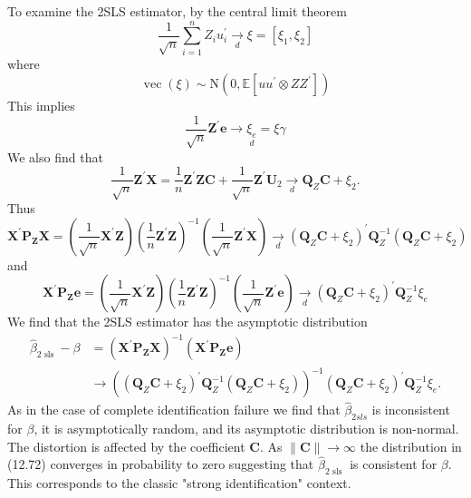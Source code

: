 \documentclass[10pt]{article}
\begin{document}
To examine the 2SLS estimator, by the central limit theorem
$$
\frac{1}{\sqrt{n}} \sum_{i=1}^{n} Z_{i} u_{i}^{\prime} \underset{d}{\longrightarrow} \xi=\left[\xi_{1}, \xi_{2}\right]
$$
where
$$
\operatorname{vec}(\xi) \sim \mathrm{N}\left(0, \mathbb{E}\left[u u^{\prime} \otimes Z Z^{\prime}\right]\right)
$$
This implies
$$
\frac{1}{\sqrt{n}} \boldsymbol{Z}^{\prime} \boldsymbol{e} \longrightarrow \underset{d}{\xi_{e}}=\xi \gamma
$$
We also find that
$$
\frac{1}{\sqrt{n}} \boldsymbol{Z}^{\prime} \boldsymbol{X}=\frac{1}{n} \boldsymbol{Z}^{\prime} \boldsymbol{Z} \boldsymbol{C}+\frac{1}{\sqrt{n}} \boldsymbol{Z}^{\prime} \boldsymbol{U}_{2} \underset{d}{\longrightarrow} \boldsymbol{Q}_{Z} \boldsymbol{C}+\xi_{2} .
$$
Thus
$$
\boldsymbol{X}^{\prime} \boldsymbol{P}_{\boldsymbol{Z}} \boldsymbol{X}=\left(\frac{1}{\sqrt{n}} \boldsymbol{X}^{\prime} \boldsymbol{Z}\right)\left(\frac{1}{n} \boldsymbol{Z}^{\prime} \boldsymbol{Z}\right)^{-1}\left(\frac{1}{\sqrt{n}} \boldsymbol{Z}^{\prime} \boldsymbol{X}\right) \underset{d}{\longrightarrow}\left(\boldsymbol{Q}_{Z} \boldsymbol{C}+\xi_{2}\right)^{\prime} \boldsymbol{Q}_{Z}^{-1}\left(\boldsymbol{Q}_{Z} \boldsymbol{C}+\xi_{2}\right)
$$
and
$$
\boldsymbol{X}^{\prime} \boldsymbol{P}_{\boldsymbol{Z}} \boldsymbol{e}=\left(\frac{1}{\sqrt{n}} \boldsymbol{X}^{\prime} \boldsymbol{Z}\right)\left(\frac{1}{n} \boldsymbol{Z}^{\prime} \boldsymbol{Z}\right)^{-1}\left(\frac{1}{\sqrt{n}} \boldsymbol{Z}^{\prime} \boldsymbol{e}\right) \underset{d}{\longrightarrow}\left(\boldsymbol{Q}_{Z} \boldsymbol{C}+\xi_{2}\right)^{\prime} \boldsymbol{Q}_{Z}^{-1} \xi_{e}
$$
We find that the 2SLS estimator has the asymptotic distribution
$$
\begin{aligned}
\widehat{\beta}_{2 \text { sls }}-\beta &=\left(\boldsymbol{X}^{\prime} \boldsymbol{P}_{\boldsymbol{Z}} \boldsymbol{X}\right)^{-1}\left(\boldsymbol{X}^{\prime} \boldsymbol{P}_{\boldsymbol{Z}} \boldsymbol{e}\right) \\
& \longrightarrow\left(\left(\boldsymbol{Q}_{Z} \boldsymbol{C}+\xi_{2}\right)^{\prime} \boldsymbol{Q}_{Z}^{-1}\left(\boldsymbol{Q}_{Z} \boldsymbol{C}+\xi_{2}\right)\right)^{-1}\left(\boldsymbol{Q}_{Z} \boldsymbol{C}+\xi_{2}\right)^{\prime} \boldsymbol{Q}_{Z}^{-1} \xi_{e} .
\end{aligned}
$$
As in the case of complete identification failure we find that $\widehat{\beta}_{2 s l s}$ is inconsistent for $\beta$, it is asymptotically random, and its asymptotic distribution is non-normal. The distortion is affected by the coefficient $\boldsymbol{C}$. As $\|\boldsymbol{C}\| \rightarrow \infty$ the distribution in (12.72) converges in probability to zero suggesting that $\widehat{\beta}_{2 \text { sls }}$ is consistent for $\beta$. This corresponds to the classic "strong identification" context.
\end{document}

